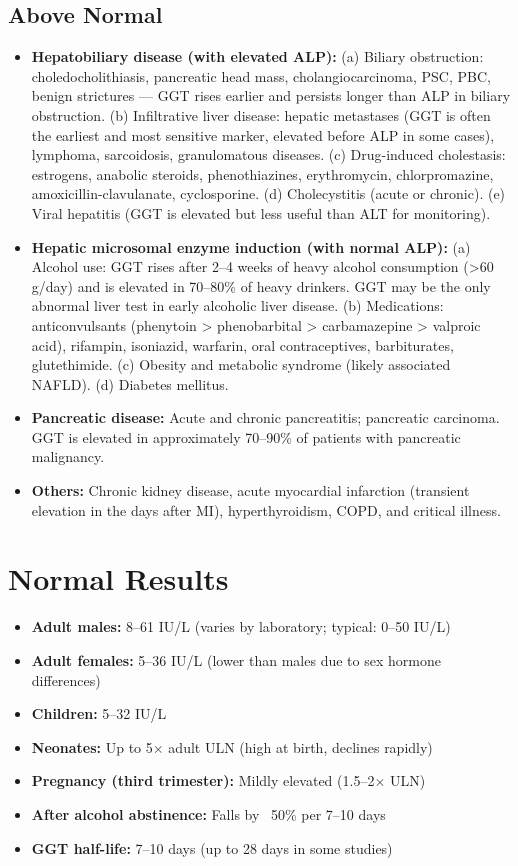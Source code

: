 \subsection*{Above Normal}
\begin{itemize}
  \item \textbf{Hepatobiliary disease (with elevated ALP):} (a) Biliary obstruction: choledocholithiasis, pancreatic head mass, cholangiocarcinoma, PSC, PBC, benign strictures --- GGT rises earlier and persists longer than ALP in biliary obstruction. (b) Infiltrative liver disease: hepatic metastases (GGT is often the earliest and most sensitive marker, elevated before ALP in some cases), lymphoma, sarcoidosis, granulomatous diseases. (c) Drug-induced cholestasis: estrogens, anabolic steroids, phenothiazines, erythromycin, chlorpromazine, amoxicillin-clavulanate, cyclosporine. (d) Cholecystitis (acute or chronic). (e) Viral hepatitis (GGT is elevated but less useful than ALT for monitoring).
  \item \textbf{Hepatic microsomal enzyme induction (with normal ALP):} (a) Alcohol use: GGT rises after 2--4 weeks of heavy alcohol consumption (>60 g/day) and is elevated in 70--80\% of heavy drinkers. GGT may be the only abnormal liver test in early alcoholic liver disease. (b) Medications: anticonvulsants (phenytoin > phenobarbital > carbamazepine > valproic acid), rifampin, isoniazid, warfarin, oral contraceptives, barbiturates, glutethimide. (c) Obesity and metabolic syndrome (likely associated NAFLD). (d) Diabetes mellitus.
  \item \textbf{Pancreatic disease:} Acute and chronic pancreatitis; pancreatic carcinoma. GGT is elevated in approximately 70--90\% of patients with pancreatic malignancy.
  \item \textbf{Others:} Chronic kidney disease, acute myocardial infarction (transient elevation in the days after MI), hyperthyroidism, COPD, and critical illness.
\end{itemize}

\section*{Normal Results}
\begin{itemize}
  \item \textbf{Adult males:} 8--61 IU/L (varies by laboratory; typical: 0--50 IU/L)
  \item \textbf{Adult females:} 5--36 IU/L (lower than males due to sex hormone differences)
  \item \textbf{Children:} 5--32 IU/L
  \item \textbf{Neonates:} Up to 5$\times$ adult ULN (high at birth, declines rapidly)
  \item \textbf{Pregnancy (third trimester):} Mildly elevated (1.5--2$\times$ ULN)
  \item \textbf{After alcohol abstinence:} Falls by ~50\% per 7--10 days
  \item \textbf{GGT half-life:} 7--10 days (up to 28 days in some studies)
\end{itemize}

